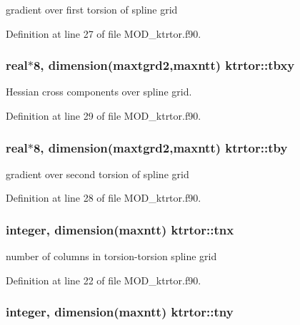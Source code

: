 gradient over first torsion of spline grid 



Definition at line 27 of file M\-O\-D\-\_\-ktrtor.\-f90.

\hypertarget{classktrtor_a766d3639dce77480684252b6be8f5b7c}{
\subsubsection[{tbxy}]{\setlength{\rightskip}{0pt plus 5cm}real$\ast$8, dimension({\bf maxtgrd2},{\bf maxntt}) ktrtor\-::tbxy}}\label{classktrtor_a766d3639dce77480684252b6be8f5b7c}


Hessian cross components over spline grid. 



Definition at line 29 of file M\-O\-D\-\_\-ktrtor.\-f90.

\hypertarget{classktrtor_afb5202fc5a804c1a2fc32e0c6b6f1dec}{
\subsubsection[{tby}]{\setlength{\rightskip}{0pt plus 5cm}real$\ast$8, dimension({\bf maxtgrd2},{\bf maxntt}) ktrtor\-::tby}}\label{classktrtor_afb5202fc5a804c1a2fc32e0c6b6f1dec}


gradient over second torsion of spline grid 



Definition at line 28 of file M\-O\-D\-\_\-ktrtor.\-f90.

\hypertarget{classktrtor_a33f01d9cd25678eee34804747d565ea0}{
\subsubsection[{tnx}]{\setlength{\rightskip}{0pt plus 5cm}integer, dimension({\bf maxntt}) ktrtor\-::tnx}}\label{classktrtor_a33f01d9cd25678eee34804747d565ea0}


number of columns in torsion-\/torsion spline grid 



Definition at line 22 of file M\-O\-D\-\_\-ktrtor.\-f90.

\hypertarget{classktrtor_a56e9a9a959e5d5dddf9ba1ab5291238b}{
\subsubsection[{tny}]{\setlength{\rightskip}{0pt plus 5cm}integer, dimension({\bf maxntt}) ktrtor\-::tny}}\label{classktrtor_a56e9a9a959e5d5dddf9ba1ab5291238b}


